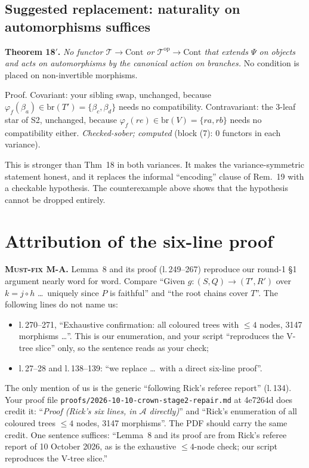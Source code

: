 \documentclass[11pt]{article}
\newcommand{\iss}[1]{\textsc{#1}}
\newcommand{\br}{\mathrm{br}}
\newcommand{\Cont}{\mathrm{Cont}}
\newcommand{\T}{\mathcal T}
\begin{document}
\subsection{Suggested replacement: naturality on automorphisms suffices}
\textbf{Theorem 18$'$.} \emph{No functor $\T\to\Cont$ or $\T^{\mathrm{op}}\to\Cont$ that extends
$\Psi$ on objects and acts on automorphisms by the canonical action on branches.} No condition is
placed on non-invertible morphisms.

Proof. Covariant: your sibling swap, unchanged, because $\varphi_f(\beta_a)\in\br(T')=\{\beta_c,\beta_d\}$
needs no compatibility. Contravariant: the 3-leaf star of S2, unchanged, because $\varphi_f(re)\in
\br(V)=\{ra,rb\}$ needs no compatibility either. \emph{Checked-sober; computed} (block (7): 0
functors in each variance).

This is stronger than Thm~18 in both variances. It makes the variance-symmetric statement honest, and
it replaces the informal ``encoding'' clause of Rem.~19 with a checkable hypothesis. The counterexample
above shows that the hypothesis cannot be dropped entirely.

\section{Attribution of the six-line proof}
\textbf{\iss{Must-fix} M-A.} Lemma~8 and its proof (l.\,249--267) reproduce our round-1 \S1
argument nearly word for word. Compare ``Given $g\colon(S,Q)\to(T',R')$ over $k=j\circ h$ \dots\
uniquely since $P$ is faithful'' and ``the root chains cover $T$''. The following lines do not name us:
\begin{itemize}[leftmargin=*]
\item l.\,270--271, ``Exhaustive confirmation: all coloured trees with $\le4$ nodes, 3147 morphisms
\dots''. This is our enumeration, and your script ``reproduces the V-tree slice'' only, so the
sentence reads as your check;
\item l.\,27--28 and l.\,138--139: ``we replace \dots\ with a direct six-line proof''.
\end{itemize}
The only mention of us is the generic ``following Rick's referee report'' (l.\,134). Your proof file
\texttt{proofs/2026-10-10-crown-stage2-repair.md} at 4e7264d does credit it: ``\emph{Proof (Rick's six
lines, in $\mathcal A$ directly)}'' and ``Rick's enumeration of all coloured trees $\le4$ nodes, 3147
morphisms''. The PDF should carry the same credit. One sentence suffices: ``Lemma~8 and its proof are
from Rick's referee report of 10 October 2026, as is the exhaustive $\le4$-node check; our script
reproduces the V-tree slice.''
\end{document}

